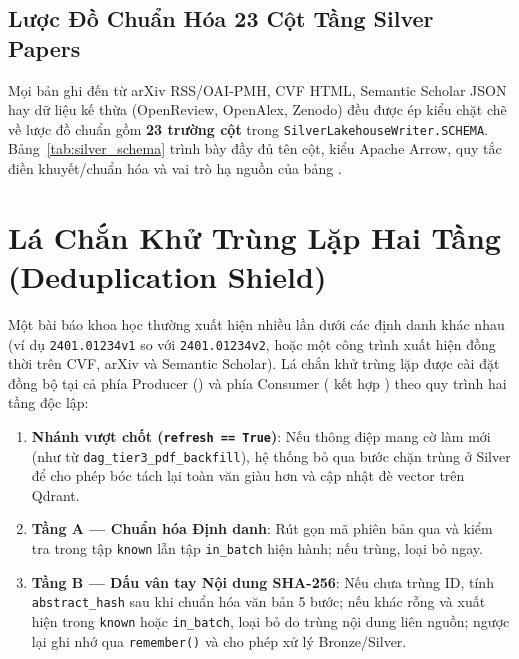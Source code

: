 \subsection{Lược Đồ Chuẩn Hóa 23 Cột Tầng Silver Papers}
\label{sec:ch2_silver_schema}

Mọi bản ghi đến từ arXiv RSS/OAI-PMH, CVF HTML, Semantic Scholar JSON hay dữ liệu kế thừa (OpenReview, OpenAlex, Zenodo) đều được ép kiểu chặt chẽ về lược đồ chuẩn gồm \textbf{23 trường cột} trong \texttt{SilverLakehouseWriter.SCHEMA}. Bảng~\ref{tab:silver_schema} trình bày đầy đủ tên cột, kiểu Apache Arrow, quy tắc điền khuyết/chuẩn hóa và vai trò hạ nguồn của bảng .



\section{Lá Chắn Khử Trùng Lặp Hai Tầng (Deduplication Shield)}
\label{sec:ch2_dedup}

Một bài báo khoa học thường xuất hiện nhiều lần dưới các định danh khác nhau (ví dụ \texttt{2401.01234v1} so với \texttt{2401.01234v2}, hoặc một công trình xuất hiện đồng thời trên CVF, arXiv và Semantic Scholar). Lá chắn khử trùng lặp được cài đặt đồng bộ tại cả phía Producer () và phía Consumer ( kết hợp ) theo quy trình hai tầng độc lập:
\begin{enumerate}[label=\textbf{\arabic*.}]
  \item \textbf{Nhánh vượt chốt (\texttt{refresh == True})}: Nếu thông điệp mang cờ làm mới (như từ \texttt{dag\_tier3\_pdf\_backfill}), hệ thống bỏ qua bước chặn trùng ở Silver để cho phép bóc tách lại toàn văn giàu hơn và cập nhật đè vector trên Qdrant.
  \item \textbf{Tầng A --- Chuẩn hóa Định danh}: Rút gọn mã phiên bản qua  và kiểm tra trong tập \texttt{known} lẫn tập \texttt{in\_batch} hiện hành; nếu trùng, loại bỏ ngay.
  \item \textbf{Tầng B --- Dấu vân tay Nội dung SHA-256}: Nếu chưa trùng ID, tính \texttt{abstract\_hash} sau khi chuẩn hóa văn bản 5 bước; nếu khác rỗng và xuất hiện trong \texttt{known} hoặc \texttt{in\_batch}, loại bỏ do trùng nội dung liên nguồn; ngược lại ghi nhớ qua \texttt{remember()} và cho phép xử lý Bronze/Silver.
\end{enumerate}

